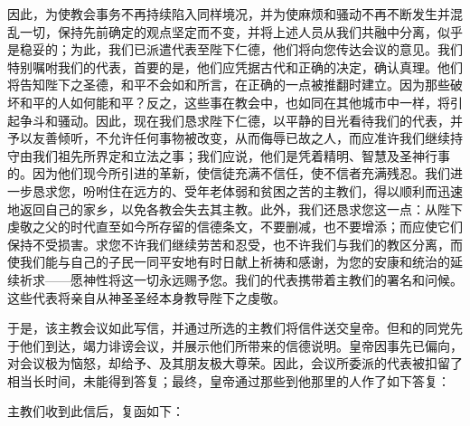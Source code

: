 因此，为使教会事务不再持续陷入同样境况，并为使麻烦和骚动不再不断发生并混乱一切，保持先前确定的观点坚定而不变，并将上述人员从我们共融中分离，似乎是稳妥的；为此，我们已派遣代表至陛下仁德，他们将向您传达会议的意见。我们特别嘱咐我们的代表，首要的是，他们应凭据古代和正确的决定，确认真理。他们将告知陛下之圣德，和平不会如和所言，在正确的一点被推翻时建立。因为那些破坏和平的人如何能和平？反之，这些事在教会中，也如同在其他城市中一样，将引起争斗和骚动。因此，现在我们恳求陛下仁德，以平静的目光看待我们的代表，并予以友善倾听，不允许任何事物被改变，从而侮辱已故之人，而应准许我们继续持守由我们祖先所界定和立法之事；我们应说，他们是凭着精明、智慧及圣神行事的。因为他们现今所引进的革新，使信徒充满不信任，使不信者充满残忍。我们进一步恳求您，吩咐住在远方的、受年老体弱和贫困之苦的主教们，得以顺利而迅速地返回自己的家乡，以免各教会失去其主教。此外，我们还恳求您这一点：从陛下虔敬之父的时代直至如今所存留的信德条文，不要删减，也不要增添；而应使它们保持不受损害。求您不许我们继续劳苦和忍受，也不许我们与我们的教区分离，而使我们能与自己的子民一同平安地有时日献上祈祷和感谢，为您的安康和统治的延续祈求——愿神性将这一切永远赐予您。我们的代表携带着主教们的署名和问候。这些代表将亲自从神圣圣经本身教导陛下之虔敬。\par

于是，该主教会议如此写信，并通过所选的主教们将信件送交皇帝。但和的同党先于他们到达，竭力诽谤会议，并展示他们所带来的信德说明。皇帝因事先已偏向，对会议极为恼怒，却给予、及其朋友极大尊荣。因此，会议所委派的代表被扣留了相当长时间，未能得到答复；最终，皇帝通过那些到他那里的人作了如下答复：\par

\par

\par

主教们收到此信后，复函如下：\par

